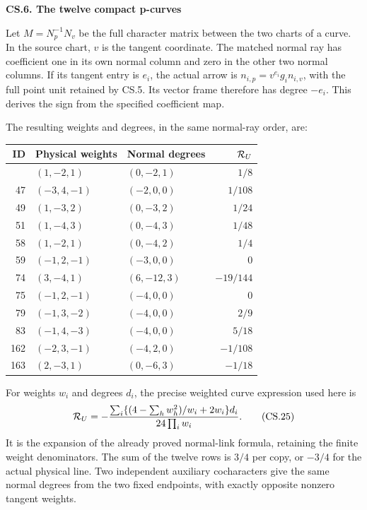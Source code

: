 \par

\medskip\noindent\textbf{CS.6. The twelve compact p-curves}

\par\nobreak

Let \(M=N_p^{-1}N_v\) be the full character matrix
between the two charts of a curve. In the source
chart, \(v\) is the tangent coordinate. The matched
normal ray has coefficient one in its own normal
column and zero in the other two normal columns.
If its tangent entry is \(e_i\), the actual arrow is
\(n_{i,p}=v^{e_i}g_i n_{i,v}\), with the full point
unit retained by CS.5. Its vector frame therefore
has degree \(-e_i\). This derives the sign from the
specified coefficient map.

The resulting weights and degrees, in the same
normal-ray order, are:

\begin{longtable}[]{@{}rllr@{}}
\toprule\noalign{}
ID & Physical weights & Normal degrees & \({\cal R}_U\) \\
\midrule\noalign{}
\endhead
\bottomrule\noalign{}
\endlastfoot
46 & \((1,-2,1)\) & \((0,-2,1)\) & \(1/8\) \\
47 & \((-3,4,-1)\) & \((-2,0,0)\) & \(1/108\) \\
49 & \((1,-3,2)\) & \((0,-3,2)\) & \(1/24\) \\
51 & \((1,-4,3)\) & \((0,-4,3)\) & \(1/48\) \\
58 & \((1,-2,1)\) & \((0,-4,2)\) & \(1/4\) \\
59 & \((-1,2,-1)\) & \((-3,0,0)\) & \(0\) \\
74 & \((3,-4,1)\) & \((6,-12,3)\) & \(-19/144\) \\
75 & \((-1,2,-1)\) & \((-4,0,0)\) & \(0\) \\
79 & \((-1,3,-2)\) & \((-4,0,0)\) & \(2/9\) \\
83 & \((-1,4,-3)\) & \((-4,0,0)\) & \(5/18\) \\
162 & \((-2,3,-1)\) & \((-4,2,0)\) & \(-1/108\) \\
163 & \((2,-3,1)\) & \((0,-6,3)\) & \(-1/18\) \\
\end{longtable}

For weights \(w_i\) and degrees \(d_i\), the precise
weighted curve expression used here is
\[
 {\cal R}_U
 =-\frac{\sum_i
       \{(4-\sum_h w_h^2)/w_i+2w_i\}d_i}
          {24\prod_iw_i}.
 \tag{CS.25}
\]
It is the expansion of the already proved
normal-link formula, retaining the finite weight
denominators. The sum of the twelve rows is
\(3/4\) per copy, or \(-3/4\) for the actual
physical line. Two independent auxiliary
cocharacters give the same normal degrees from
the two fixed endpoints, with exactly opposite
nonzero tangent weights.


